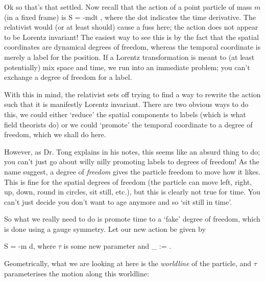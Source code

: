 Ok so that's that settled. Now recall that the action of a point particle of mass $m$ (in a fixed frame) is 
\be
\label{eqn:PointActionSpatial}
    S = -m\int dt ,
\ee 
where the dot indicates the time derivative. The relativist would (or at least should) cause a fuss here; the action  does not appear to be Lorentz invariant! The easiest way to see this is by the fact that the spatial coordinates are dynamical degrees of freedom, whereas the temporal coordinate is merely a label for the position. If a Lorentz transformation is meant to (at least potentially) mix space and time, we run into an immediate problem; you can't exchange a degree of freedom for a label. 

With this in mind, the relativist sets off trying to find a way to rewrite the action such that it is manifestly Lorentz invariant. There are two obvious ways to do this, we could either `reduce' the spatial components to labels (which is what field theorists do) or we could `promote' the temporal coordinate to a degree of freedom, which we shall do here.

However, as Dr. Tong explains in his notes, this seems like an absurd thing to do; you can't just go about willy nilly promoting labels to degrees of freedom! As the name suggest, a degree of \textit{freedom} gives the particle freedom to move how it likes. This is fine for the spatial degrees of freedom (the particle can move left, right, up, down, round in circles, sit still, etc.), but this is clearly not true for time. You can't just decide you don't want to age anymore and so `sit still in time'. 

So what we really need to do is promote time to a `fake' degree of freedom, which is done using a gauge symmetry. Let our new action be given by 

\be 
\label{eqn:PointActionLorentz}
    S = -m \int d\tau {},
\ee 
where $\tau$ is some new parameter and
\bse 
    _{\mu} := .
\ese 

Geometrically, what we are looking at here is the \textit{worldline} of the particle, and $\tau$ parameterises the motion along this worldline:

